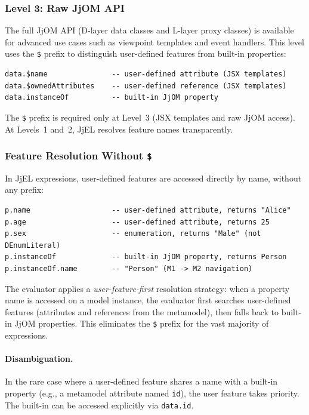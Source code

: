 \documentclass[11pt,a4paper]{article}
\newcommand{\jjel}{\textsf{JjEL}}
\begin{document}
\subsubsection{Level 3: Raw JjOM API}

The full JjOM API (D-layer data classes and L-layer proxy classes) is available for advanced use cases such as viewpoint templates and event handlers. This level uses the \texttt{\$} prefix to distinguish user-defined features from built-in properties:

\begin{lstlisting}[style=jjel,numbers=none]
data.$name               -- user-defined attribute (JSX templates)
data.$ownedAttributes    -- user-defined reference (JSX templates)
data.instanceOf          -- built-in JjOM property
\end{lstlisting}

The \texttt{\$} prefix is required only at Level~3 (JSX templates and raw JjOM access). At Levels~1 and~2, \jjel{} resolves feature names transparently.

\subsubsection{Feature Resolution Without \texttt{\$}}

In \jjel{} expressions, user-defined features are accessed directly by name, without any prefix:

\begin{lstlisting}[style=jjel,numbers=none]
p.name                   -- user-defined attribute, returns "Alice"
p.age                    -- user-defined attribute, returns 25
p.sex                    -- enumeration, returns "Male" (not DEnumLiteral)
p.instanceOf             -- built-in JjOM property, returns Person
p.instanceOf.name        -- "Person" (M1 -> M2 navigation)
\end{lstlisting}

The evaluator applies a \emph{user-feature-first} resolution strategy: when a property name is accessed on a model instance, the evaluator first searches user-defined features (attributes and references from the metamodel), then falls back to built-in JjOM properties. This eliminates the \texttt{\$} prefix for the vast majority of expressions.

\paragraph{Disambiguation.} In the rare case where a user-defined feature shares a name with a built-in property (e.g., a metamodel attribute named \texttt{id}), the user feature takes priority. The built-in can be accessed explicitly via \texttt{data.id}.
\end{document}
